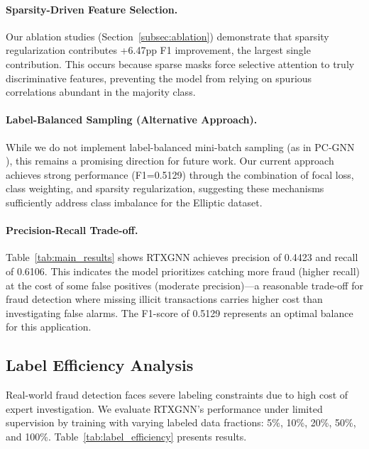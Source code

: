 \paragraph{Sparsity-Driven Feature Selection.} Our ablation studies (Section~\ref{subsec:ablation}) demonstrate that sparsity regularization contributes +6.47pp F1 improvement, the largest single contribution. This occurs because sparse masks force selective attention to truly discriminative features, preventing the model from relying on spurious correlations abundant in the majority class.

\paragraph{Label-Balanced Sampling (Alternative Approach).} While we do not implement label-balanced mini-batch sampling (as in PC-GNN \citep{liu2021pcgnn}), this remains a promising direction for future work. Our current approach achieves strong performance (F1=0.5129) through the combination of focal loss, class weighting, and sparsity regularization, suggesting these mechanisms sufficiently address class imbalance for the Elliptic dataset.

\paragraph{Precision-Recall Trade-off.} Table~\ref{tab:main_results} shows RTXGNN achieves precision of 0.4423 and recall of 0.6106. This indicates the model prioritizes catching more fraud (higher recall) at the cost of some false positives (moderate precision)—a reasonable trade-off for fraud detection where missing illicit transactions carries higher cost than investigating false alarms. The F1-score of 0.5129 represents an optimal balance for this application.

\subsection{Label Efficiency Analysis}
\label{subsec:label_efficiency}

Real-world fraud detection faces severe labeling constraints due to high cost of expert investigation. We evaluate RTXGNN's performance under limited supervision by training with varying labeled data fractions: 5\%, 10\%, 20\%, 50\%, and 100\%. Table~\ref{tab:label_efficiency} presents results.

